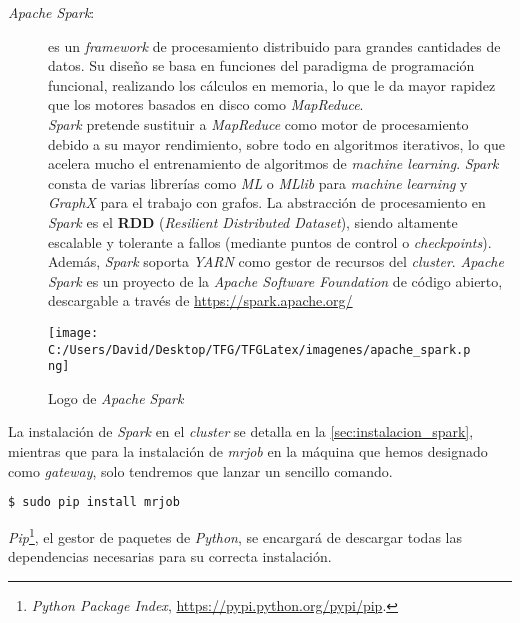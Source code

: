 \begin{description}
  \item[\textit{Apache Spark}:] es un \textit{framework} de procesamiento 
  distribuido para grandes cantidades de datos. Su diseño se basa en funciones del paradigma de programación 
  funcional, realizando los cálculos en memoria, lo que le da mayor rapidez que los motores basados en disco 
  como \textit{MapReduce}.\\
  \textit{Spark} pretende sustituir a \textit{MapReduce} como motor de procesamiento debido a su 
  mayor rendimiento, sobre todo en algoritmos iterativos, lo que acelera mucho el entrenamiento 
  de algoritmos de \textit{machine learning}.
  \textit{Spark} consta de varias librerías como \textit{ML} o \textit{MLlib} para \textit{machine learning} y 
  \textit{GraphX} para el trabajo con grafos.
  La abstracción de procesamiento en \textit{Spark} es el \textbf{RDD} (\textit{Resilient Distributed Dataset}), 
  siendo altamente escalable y tolerante a fallos (mediante puntos de control o \textit{checkpoints}).
  Además, \textit{Spark} soporta \textit{YARN} como gestor de recursos del \textit{cluster}.
  \textit{Apache Spark} es un proyecto de la \textit{Apache Software Foundation} de código abierto, descargable a 
  través de \url{https://spark.apache.org/}
\end{description}


\begin{figure}[!htpb]
  \centering
  \texttt{[image: C:/Users/David/Desktop/TFG/TFGLatex/imagenes/apache\_spark.png]}
  \caption[Logo \textit{Apache Spark}]{Logo de \textit{Apache Spark}}
  \label{spark-devs1}
\end{figure}

La instalación de \textit{Spark} en el \textit{cluster} se detalla en la \autoref{sec:instalacion_spark},
mientras que para la instalación de \textit{mrjob} en la máquina que hemos designado como \textit{gateway},
solo tendremos que lanzar un sencillo comando.\\

\begin{lstlisting}[language=bash, numbers=none]
$ sudo pip install mrjob
\end{lstlisting}

\textit{Pip}\footnote{\textit{Python Package Index}, \url{https://pypi.python.org/pypi/pip}.}, 
el gestor de paquetes de \textit{Python}, se encargará de descargar todas las dependencias
 necesarias para su correcta instalación.

